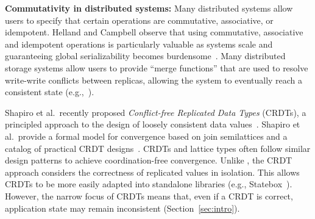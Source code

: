 \vspace{0.5em}\noindent
\textbf{Commutativity in distributed systems:} Many distributed systems allow
users to specify that certain operations are commutative, associative, or
idempotent. Helland and Campbell observe that using commutative, associative and
idempotent operations is particularly valuable as systems scale and guaranteeing
global serializability becomes burdensome~\cite{Helland2009}. Many
distributed storage systems allow users to provide ``merge functions'' that are
used to resolve write-write conflicts between replicas, allowing the system to
eventually reach a consistent state
(e.g.,~\cite{DeCandia2007,statebox,Lloyd2011,Power2010,Terry1995}).%



Shapiro et al.\ recently proposed \emph{Conflict-free Replicated Data Types}
(CRDTs), a principled approach to the design of loosely consistent data
values~\cite{Shapiro2011b}. Shapiro et al.\ provide a formal model for
convergence based on join semilattices and a catalog of practical CRDT
designs~\cite{Shapiro2011a}. CRDTs and \lang lattice types often follow similar
design patterns to achieve coordination-free convergence. Unlike \lang, the CRDT
approach considers the correctness of replicated values in isolation. This
allows CRDTs to be more easily adapted into standalone libraries (e.g.,
Statebox~\cite{statebox}). However, the narrow focus of CRDTs means that, even
if a CRDT is correct, application state may remain inconsistent
(Section~\ref{sec:intro}).

